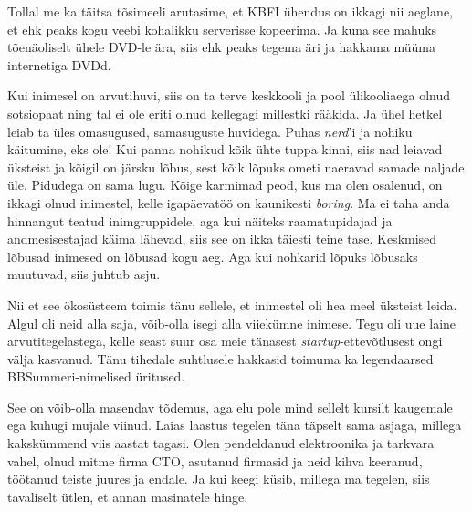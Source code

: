 Tollal me ka täitsa tõsimeeli arutasime, 
et KBFI ühendus on ikkagi nii aeglane, et ehk peaks kogu 
veebi kohalikku serverisse kopeerima. Ja 
kuna see mahuks tõenäoliselt ühele DVD-le ära, siis ehk peaks tegema 
äri ja hakkama müüma internetiga DVDd. 


Kui inimesel on arvutihuvi, siis on ta
terve keskkooli ja pool ülikooliaega olnud sotsiopaat ning tal ei ole eriti 
olnud kellegagi millestki rääkida. Ja ühel hetkel leiab ta üles omasugused, 
samasuguste huvidega. Puhas \emph{nerd}'i ja nohiku käitumine, eks ole! 
Kui panna nohikud kõik ühte tuppa kinni, siis nad leiavad 
üksteist ja kõigil on järsku lõbus, sest kõik lõpuks ometi naeravad samade 
naljade üle. Pidudega on sama lugu. Kõige karmimad peod, kus ma 
olen osalenud, on ikkagi olnud inimestel, kelle igapäevatöö on kaunikesti 
\emph{boring}. Ma ei taha anda hinnangut teatud inimgruppidele, aga kui näiteks
 raamatupidajad ja andmesisestajad käima lähevad, siis see on 
ikka täiesti teine tase. Keskmised lõbusad inimesed on lõbusad 
kogu aeg. Aga kui nohkarid lõpuks lõbusaks muutuvad, siis juhtub asju.

Nii et see ökosüsteem toimis tänu sellele, et inimestel oli hea meel üksteist 
leida. 
Algul oli neid alla saja, 
võib-olla isegi alla viiekümne inimese. Tegu oli uue 
laine arvutitegelastega, kelle seast suur osa meie tänasest 
\emph{startup}-ettevõtlusest 
ongi välja kasvanud. Tänu tihedale suhtlusele hakkasid 
toimuma ka legendaarsed BBSummeri-nimelised üritused. 


See on võib-olla masendav tõdemus, aga elu pole mind sellelt kursilt
kaugemale ega kuhugi mujale viinud. Laias laastus 
tegelen täna täpselt sama asjaga, millega kakskümmend viis aastat 
tagasi. Olen pendeldanud elektroonika ja tarkvara vahel, 
olnud mitme firma CTO, asutanud firmasid ja neid kihva keeranud, töötanud 
teiste juures ja endale. Ja kui keegi küsib, millega ma tegelen, 
siis tavaliselt ütlen, et annan masinatele hinge. 


